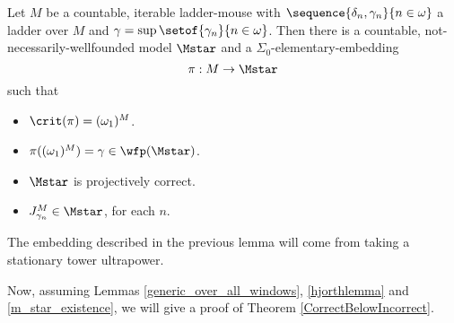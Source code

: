 \documentclass[oneside,12pt]{amsart}
\begin{document}
\begin{lemma}
\label{m_star_existence}
Let $M$ be a countable, iterable ladder-mouse
with $\sequence{\delta_n,\gamma_n}{n\in\omega}$ a ladder over $M$ and
$\gamma=\sup\setof{\gamma_n}{n\in\omega}$. Then there is a countable,
not-necessarily-wellfounded model $\Mstar$ and a $\Sigma_0$-elementary-embedding
$$\pi:M\to\Mstar$$
such that
\begin{itemize}
\item $\crit(\pi) = (\omega_1)^M$.
\item $\pi((\omega_1)^M) = \gamma \in \wfp(\Mstar)$.
\item $\Mstar$ is projectively correct.
\item $J^{M}_{\gamma_n}\in\Mstar$, for each $n$.
\end{itemize}
\end{lemma}

The embedding described in the previous lemma will come from taking a stationary tower
ultrapower.

Now, assuming Lemmas \ref{generic_over_all_windows}, \ref{hjorthlemma} and
\ref{m_star_existence}, we will give a proof of Theorem \ref{CorrectBelowIncorrect}.
\end{document}

